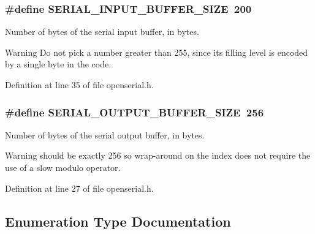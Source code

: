 \subsubsection[{\texorpdfstring{S\+E\+R\+I\+A\+L\+\_\+\+I\+N\+P\+U\+T\+\_\+\+B\+U\+F\+F\+E\+R\+\_\+\+S\+I\+ZE}{SERIAL_INPUT_BUFFER_SIZE}}]{\setlength{\rightskip}{0pt plus 5cm}\#define S\+E\+R\+I\+A\+L\+\_\+\+I\+N\+P\+U\+T\+\_\+\+B\+U\+F\+F\+E\+R\+\_\+\+S\+I\+ZE~200}\hypertarget{group___open_serial_ga8221a6836587db0f71d30e1da1c1bab3}{}\label{group___open_serial_ga8221a6836587db0f71d30e1da1c1bab3}


Number of bytes of the serial input buffer, in bytes. 

\begin{DoxyWarning}{Warning}
Do not pick a number greater than 255, since its filling level is encoded by a single byte in the code. 
\end{DoxyWarning}


Definition at line 35 of file openserial.\+h.

\subsubsection[{\texorpdfstring{S\+E\+R\+I\+A\+L\+\_\+\+O\+U\+T\+P\+U\+T\+\_\+\+B\+U\+F\+F\+E\+R\+\_\+\+S\+I\+ZE}{SERIAL_OUTPUT_BUFFER_SIZE}}]{\setlength{\rightskip}{0pt plus 5cm}\#define S\+E\+R\+I\+A\+L\+\_\+\+O\+U\+T\+P\+U\+T\+\_\+\+B\+U\+F\+F\+E\+R\+\_\+\+S\+I\+ZE~256}\hypertarget{group___open_serial_gabfe80eb43785493f268187a201692d8e}{}\label{group___open_serial_gabfe80eb43785493f268187a201692d8e}


Number of bytes of the serial output buffer, in bytes. 

\begin{DoxyWarning}{Warning}
should be exactly 256 so wrap-\/around on the index does not require the use of a slow modulo operator. 
\end{DoxyWarning}


Definition at line 27 of file openserial.\+h.



\subsection{Enumeration Type Documentation}
